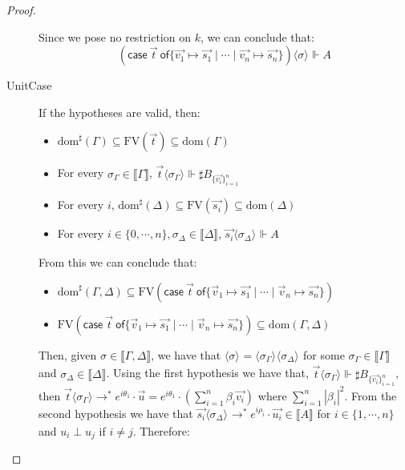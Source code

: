 \documentclass[runningheads,orivec,envcountsame,envcountsect]{llncs}
\newcommand\lra{\longrightarrow}
\newcommand\ansubst[2]{\ensuremath{\langle #1 \rangle_{#2}}}
\newcommand\dom[1]{\mathrm{dom}(#1)}
\newcommand\sdom[1]{\mathrm{dom}^{\sharp}(#1)}
\newcommand\FV[1]{\mathrm{FV}(#1)}
\def\gencase#1#2#3#4#5{\ensuremath{\mathsf{case}~#1~\mathsf{of} \{#2\mapsto #4 \mid \dotsb \mid #3\mapsto #5\}}}
\def\eval{\lra^*}
\def\sem#1{\llbracket#1\rrbracket}
\def\real{\Vdash}
\newcommand\genbasis[3]{\ensuremath{B_{\{#1\}_{#2}^{#3}}}}
\begin{document}
\begin{proof}
\begin{description}
    Since we pose no restriction on $k$, we can conclude that:
    \[(\gencase{\vec{t}}{\vec{v_1}}{\vec{v_n}}{\vec{s_1}}{\vec{s_n}})\ansubst{\sigma}{}\real A\]


    \item[UnitCase] If the hypotheses are valid, then:
    \begin{itemize}
        \item $\sdom{\Gamma}\subseteq \FV{\vec{t}}\subseteq \dom{\Gamma}$
        \item For every $\sigma_\Gamma\in\sem{\Gamma}$, $\vec{t}\ansubst{\sigma_\Gamma}{}\real\sharp\genbasis{\vec{v_i}}{i=1}{n}$
        \item For every $i$, $\sdom{\Delta}\subseteq \FV{\vec{s_i}}\subseteq \dom{\Delta}$
        \item For every $i\in\{0,\dotsb ,n\}, \sigma_\Delta\in\sem{\Delta}$, $\vec{s_i}\ansubst{\sigma_\Delta}{}\real A$
    \end{itemize}
    
    From this we can conclude that:
    
    \begin{itemize}
        \item $\sdom{\Gamma,\Delta}\subseteq \FV{\gencase{\vec{t}}{\vec v_1}{\vec v_n}{\vec{s_1}}{\vec{s_n}}}$
        \item $\FV{\gencase{\vec{t}}{\vec v_1}{\vec v_n}{\vec{s_1}}{\vec{s_n}}}\subseteq \dom{\Gamma,\Delta}$
    \end{itemize}
    
    Then, given $\sigma\in\sem{\Gamma,\Delta}$, we have that $\ansubst{\sigma}{}=\ansubst{\sigma_\Gamma}{}\ansubst{\sigma_\Delta}{}$ for some $\sigma_\Gamma\in\sem{\Gamma}$ and $\sigma_\Delta\in\sem{\Delta}$. Using the first hypothesis we have that, $\vec{t}\ansubst{\sigma_\Gamma}{}\real\sharp\genbasis{\vec{v_i}}{i=1}{n}$, then $\vec{t}\ansubst{\sigma_\Gamma}{}\eval e^{i\theta_1}\cdot\vec{u}=e^{i\theta_1}\cdot(\sum_{i=1}^{n}\beta_i \vec{v_i})$ where $\sum_{i=1}^{n}|\beta_i|^2$. From the second hypothesis we have that $\vec{s_i}\ansubst{\sigma_\Delta}{}\eval e^{i\rho_i}\cdot\vec{u_i}\in\sem{A}$ for $i\in\{1,\dotsb ,n\}$ and $u_i\perp u_j$ if $i\neq j$. Therefore:


\end{description}
\end{proof}
\end{document}
